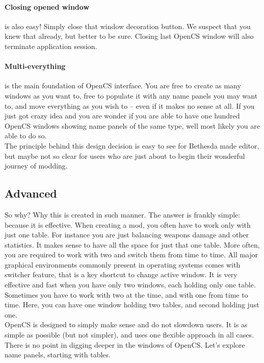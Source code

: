 \paragraph{Closing opened window}
is also easy! Simply close that window decoration button. We suspect that you knew that already, but better to be sure. Closing last Open{CS} window will also terminate application session.

\paragraph{Multi-everything}
is the main foundation of Open{CS} interface. You are free to create as many windows as you want to, free to populate it with any name panels you may want to, and move everything as you wish to -- even if it makes no sense at all. If you just got crazy idea and you are wonder if you are able to have one hundred Open{CS} windows showing name panels of the same type, well most likely you are able to do so.\\

The principle behind this design decision is easy to see for Bethesda made editor, but maybe not so clear for users who are just about to begin their wonderful journey of modding.\\

\subsection{Advanced}
So why? Why this is created in such manner. The answer is frankly simple: because it is effective. When creating a mod, you often have to work only with just one table. For instance you are just balancing weapons damage and other statistics. It makes sense to have all the space for just that one table. More often, you are required to work with two and switch them from time to time. All major graphical environments commonly present in operating systems comes with switcher feature, that is a key shortcut to change active window. It is very effective and fast when you have only two windows, each holding only one table. Sometimes you have to work with two at the time, and with one from time to time. Here, you can have one window holding two tables, and second holding just one.\\

Open{CS} is designed to simply make sense and do not slowdown users. It is as simple as possible (but not simpler), and uses one flexible approach in all cases.\\

There is no point in digging deeper in the windows of Open{CS}. Let's explore name panels, starting with tables.


